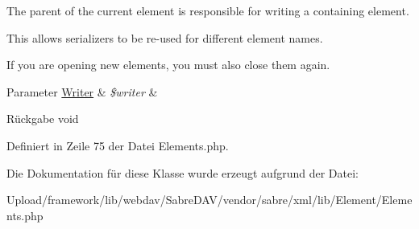 The parent of the current element is responsible for writing a containing element.

This allows serializers to be re-\/used for different element names.

If you are opening new elements, you must also close them again.


\begin{DoxyParams}[1]{Parameter}
\mbox{\hyperlink{class_sabre_1_1_xml_1_1_writer}{Writer}} & {\em \$writer} & \\
\hline
\end{DoxyParams}
\begin{DoxyReturn}{Rückgabe}
void 
\end{DoxyReturn}


Definiert in Zeile 75 der Datei Elements.\+php.



Die Dokumentation für diese Klasse wurde erzeugt aufgrund der Datei\+:\begin{DoxyCompactItemize}
\item 
Upload/framework/lib/webdav/\+Sabre\+D\+A\+V/vendor/sabre/xml/lib/\+Element/Elements.\+php\end{DoxyCompactItemize}
